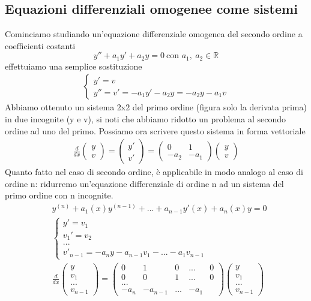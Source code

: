 \documentclass[10pt,a4paper]{article}
\begin{document}
\subsection{Equazioni differenziali omogenee come sistemi}
Cominciamo studiando un'equazione differenziale omogenea del secondo ordine a coefficienti costanti
\[y''+a_1y'+a_2y=0\ \text{con } a_1,\ a_2 \in \mathbb{R}\]
effettuiamo una semplice sostituzione 
\begin{align*}
	\begin{cases}
		y' = v\\
		y'' = v' = -a_1 y'-a_2y = -a_2 y - a_1 v
	\end{cases}
\end{align*}
Abbiamo ottenuto un sistema 2x2 del primo ordine (figura solo la derivata prima) in due incognite (y e v), si noti che abbiamo ridotto un problema al secondo ordine ad uno del primo. Possiamo ora scrivere questo sistema in forma vettoriale
\begin{align*}
	\frac{d}{dx}\begin{pmatrix}y\\ v\end{pmatrix} = \begin{pmatrix}y'\\ v'\end{pmatrix}=\begin{pmatrix}0&1\\ -a_2&-a_1\end{pmatrix}\begin{pmatrix}y\\ v\end{pmatrix}
\end{align*}
Quanto fatto nel caso di secondo ordine, è applicabile in modo analogo al caso di ordine n: ridurremo un'equazione differenziale di ordine n ad un sistema del primo ordine con n incognite.
\begin{align*}
	&y^{(n)} + a_1(x)y^{(n-1)} +...+ a_{n-1} y'(x) + a_n(x)y = 0\\
	&\begin{cases}
		y' = v_1\\
		v_1' = v_2\\
		...\\
		v'_{n-1} = -a_n y-a_{n-1}v_1-...-a_1v_{n-1}
	\end{cases}\\
	&\frac{d}{dx}\begin{pmatrix}y\\ v_1\\...\\ v_{n-1}\end{pmatrix} = \begin{pmatrix}
		0&1&0&...&0\\
		0&0&1&...&0\\
		...\\
		-a_n&-a_{n-1}&...&-a_1
	\end{pmatrix}\begin{pmatrix}y\\ v_1\\...\\v_{n-1}\end{pmatrix}
\end{align*}  
\end{document}
